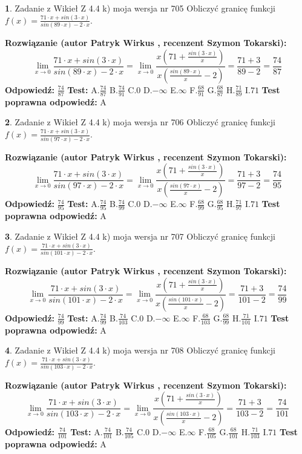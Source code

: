 \documentclass[12pt, a4paper]{article}
\theoremstyle{definition} %
\newtheorem{zad}{}
\newcommand{\zadStart}[1]{\begin{zad}#1\newline}
\newcommand{\zadStop}{\end{zad}}
\newcommand{\rozwStart}[2]{\noindent \textbf{Rozwiązanie (autor #1 , recenzent #2): }\newline}
\newcommand{\rozwStop}{\newline}
\newcommand{\odpStart}{\noindent \textbf{Odpowiedź:}\newline}
\newcommand{\odpStop}{\newline}
\newcommand{\testStart}{\noindent \textbf{Test:}\newline}
\newcommand{\testStop}{\newline}
\newcommand{\kluczStart}{\noindent \textbf{Test poprawna odpowiedź:}\newline}
\newcommand{\kluczStop}{\newline}
\begin{document}
\zadStart{Zadanie z Wikieł Z 4.4 k) moja wersja nr 705}
Obliczyć granicę funkcji $f(x)=\frac{71\cdot x +sin(3\cdot x)}{sin(89\cdot x) -2\cdot x}$.
\zadStop
\rozwStart{Patryk Wirkus}{Szymon Tokarski}
$$\lim\limits_{x\to 0}\frac{71\cdot x +sin(3\cdot x)}{sin(89\cdot x) -2\cdot x}
=\lim\limits_{x\to 0}\frac{x(71+\frac{sin(3\cdot x)}{x})}{x(\frac{sin(89\cdot x)}{x}-2)}
=\frac{71+3}{89-2} = \frac{74}{87}$$
\rozwStop
\odpStart
$\frac{74}{87}$
\odpStop
\testStart
A.$\frac{74}{87}$
B.$\frac{74}{91}$
C.$0$
D.$-\infty$
E.$\infty$
F.$\frac{68}{91}$
G.$\frac{68}{87}$
H.$\frac{71}{89}$
I.$71$
\testStop
\kluczStart
A
\kluczStop



\zadStart{Zadanie z Wikieł Z 4.4 k) moja wersja nr 706}
Obliczyć granicę funkcji $f(x)=\frac{71\cdot x +sin(3\cdot x)}{sin(97\cdot x) -2\cdot x}$.
\zadStop
\rozwStart{Patryk Wirkus}{Szymon Tokarski}
$$\lim\limits_{x\to 0}\frac{71\cdot x +sin(3\cdot x)}{sin(97\cdot x) -2\cdot x}
=\lim\limits_{x\to 0}\frac{x(71+\frac{sin(3\cdot x)}{x})}{x(\frac{sin(97\cdot x)}{x}-2)}
=\frac{71+3}{97-2} = \frac{74}{95}$$
\rozwStop
\odpStart
$\frac{74}{95}$
\odpStop
\testStart
A.$\frac{74}{95}$
B.$\frac{74}{99}$
C.$0$
D.$-\infty$
E.$\infty$
F.$\frac{68}{99}$
G.$\frac{68}{95}$
H.$\frac{71}{97}$
I.$71$
\testStop
\kluczStart
A
\kluczStop



\zadStart{Zadanie z Wikieł Z 4.4 k) moja wersja nr 707}
Obliczyć granicę funkcji $f(x)=\frac{71\cdot x +sin(3\cdot x)}{sin(101\cdot x) -2\cdot x}$.
\zadStop
\rozwStart{Patryk Wirkus}{Szymon Tokarski}
$$\lim\limits_{x\to 0}\frac{71\cdot x +sin(3\cdot x)}{sin(101\cdot x) -2\cdot x}
=\lim\limits_{x\to 0}\frac{x(71+\frac{sin(3\cdot x)}{x})}{x(\frac{sin(101\cdot x)}{x}-2)}
=\frac{71+3}{101-2} = \frac{74}{99}$$
\rozwStop
\odpStart
$\frac{74}{99}$
\odpStop
\testStart
A.$\frac{74}{99}$
B.$\frac{74}{103}$
C.$0$
D.$-\infty$
E.$\infty$
F.$\frac{68}{103}$
G.$\frac{68}{99}$
H.$\frac{71}{101}$
I.$71$
\testStop
\kluczStart
A
\kluczStop



\zadStart{Zadanie z Wikieł Z 4.4 k) moja wersja nr 708}
Obliczyć granicę funkcji $f(x)=\frac{71\cdot x +sin(3\cdot x)}{sin(103\cdot x) -2\cdot x}$.
\zadStop
\rozwStart{Patryk Wirkus}{Szymon Tokarski}
$$\lim\limits_{x\to 0}\frac{71\cdot x +sin(3\cdot x)}{sin(103\cdot x) -2\cdot x}
=\lim\limits_{x\to 0}\frac{x(71+\frac{sin(3\cdot x)}{x})}{x(\frac{sin(103\cdot x)}{x}-2)}
=\frac{71+3}{103-2} = \frac{74}{101}$$
\rozwStop
\odpStart
$\frac{74}{101}$
\odpStop
\testStart
A.$\frac{74}{101}$
B.$\frac{74}{105}$
C.$0$
D.$-\infty$
E.$\infty$
F.$\frac{68}{105}$
G.$\frac{68}{101}$
H.$\frac{71}{103}$
I.$71$
\testStop
\kluczStart
A
\kluczStop
\end{document}
